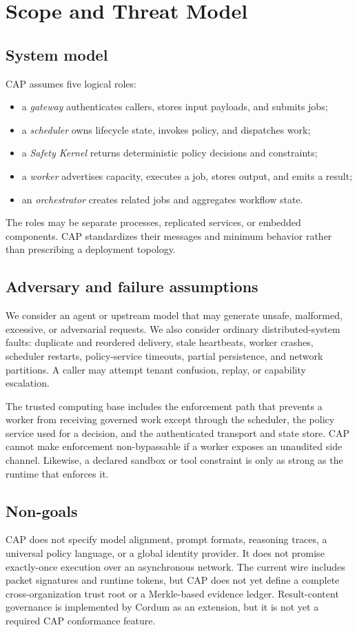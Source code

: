 \section{Scope and Threat Model}

\subsection{System model}

CAP assumes five logical roles:
\begin{itemize}[leftmargin=*,nosep]
  \item a \emph{gateway} authenticates callers, stores input payloads, and submits jobs;
  \item a \emph{scheduler} owns lifecycle state, invokes policy, and dispatches work;
  \item a \emph{Safety Kernel} returns deterministic policy decisions and constraints;
  \item a \emph{worker} advertises capacity, executes a job, stores output, and emits a result;
  \item an \emph{orchestrator} creates related jobs and aggregates workflow state.
\end{itemize}
The roles may be separate processes, replicated services, or embedded components. CAP standardizes their messages and minimum behavior rather than prescribing a deployment topology.

\subsection{Adversary and failure assumptions}

We consider an agent or upstream model that may generate unsafe, malformed, excessive, or adversarial requests. We also consider ordinary distributed-system faults: duplicate and reordered delivery, stale heartbeats, worker crashes, scheduler restarts, policy-service timeouts, partial persistence, and network partitions. A caller may attempt tenant confusion, replay, or capability escalation.

The trusted computing base includes the enforcement path that prevents a worker from receiving governed work except through the scheduler, the policy service used for a decision, and the authenticated transport and state store. CAP cannot make enforcement non-bypassable if a worker exposes an unaudited side channel. Likewise, a declared sandbox or tool constraint is only as strong as the runtime that enforces it.

\subsection{Non-goals}

CAP does not specify model alignment, prompt formats, reasoning traces, a universal policy language, or a global identity provider. It does not promise exactly-once execution over an asynchronous network. The current wire includes packet signatures and runtime tokens, but CAP does not yet define a complete cross-organization trust root or a Merkle-based evidence ledger. Result-content governance is implemented by Cordum as an extension, but it is not yet a required CAP conformance feature.
